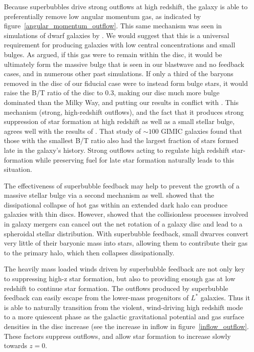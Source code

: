 Because superbubbles drive strong outflows at high redshift, the galaxy is able
to preferentially remove low angular momentum gas, as indicated by
figure~\ref{angular_momentum_outflow}. This same mechanism  was seen in
simulations of dwarf galaxies by \citet{Brook2011,Brook2012}.  We would suggest
that this is a universal requirement for producing galaxies with low central
concentrations and small bulges.  As \citet{Binney2001} argued, if this gas were
to remain within the disc, it would be ultimately form the massive bulge that is
seen in our blastwave and no feedback cases, and in numerous other past
simulations.  If only a third of the baryons removed in the disc of our fiducial
case were to instead form bulge stars, it would raise the B/T ratio of the disc
to 0.3, making our disc much more bulge dominated than the Milky Way, and
putting our results in conflict with \citet{Allen2006}.  This mechanism (strong,
high-redshift outflows), and the fact that it produces strong suppression of
star formation at high redshift as well as a small stellar bulge, agrees well
with the results of \citet{Sales2012}.  That study of $\sim100$ GIMIC
\citep{Crain2009} galaxies found that those with the smallest B/T ratio also had
the largest fraction of stars formed late in the galaxy's history.  Strong
outflows acting to regulate high redshift star-formation while preserving fuel
for late star formation naturally leads to this situation.

The effectiveness of superbubble feedback may help to prevent the growth of a
massive stellar bulge via a second mechanism as well.  \citet{Fall1980} showed
that the dissipational collapse of hot gas within an extended dark halo can
produce galaxies with thin discs.  However, \citet{Cole2000} showed that the
collisionless processes involved in galaxy mergers can cancel out the net
rotation of a galaxy disc and lead to a spheroidal stellar distribution.  With
superbubble feedback, small dwarves convert very little of their baryonic mass
into stars, allowing them to contribute their gas to the primary halo, which
then collapses dissipationally.  

The heavily mass loaded winds driven by superbubble feedback are not only key to
suppressing high-z star formation, but also to providing enough gas at low
redshift to continue star formation.  The outflows produced by superbubble
feedback can easily escape from the lower-mass progenitors of ${L^*}$ galaxies.
Thus it is able to naturally transition from the violent, wind-driving high
redshift mode to a more quiescent phase as the galactic gravitational potential
and gas surface densities in the disc increase (see the increase in inflow in
figure~\ref{inflow_outflow}.  These factors suppress outflows, and allow star
formation to increase slowly towards $z=0$.

